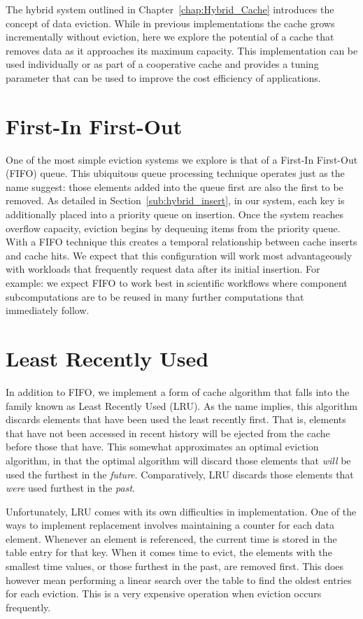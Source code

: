 The hybrid system outlined in Chapter~\ref{chap:Hybrid_Cache} introduces the
concept of data eviction. While in previous implementations the cache grows
incrementally without eviction, here we explore the potential of a cache that
removes data as it approaches its maximum capacity. This implementation can be
used individually or as part of a cooperative cache and provides a tuning
parameter that can be used to improve the cost efficiency of applications.

\section{First-In First-Out} %
\label{sec:fifo}
One of the most simple eviction systems we explore is that of a First-In
First-Out (FIFO) queue. This ubiquitous queue processing technique operates
just as the name suggest: those elements added into the queue first are also
the first to be removed. As detailed in Section~\ref{sub:hybrid_insert}, in our
system, each key is additionally placed into a priority queue on insertion. Once
the system reaches overflow capacity, eviction begins by dequeuing items from
the priority queue. With a FIFO technique this creates a temporal relationship
between cache inserts and cache hits. We expect that this configuration will
work most advantageously with workloads that frequently request data after its
initial insertion. For example: we expect FIFO to work best in scientific
workflows where component subcomputations are to be reused in many further
computations that immediately follow.


\section{Least Recently Used} %
\label{sec:lru}
In addition to FIFO, we implement a form of cache algorithm that falls into the
family known as Least Recently Used (LRU). As the name implies, this algorithm
discards elements that have been used the least recently first. That is,
elements that have not been accessed in recent history will be ejected from the
cache before those that have. This somewhat approximates an optimal eviction
algorithm, in that the optimal algorithm will discard those elements that
\emph{will} be used the furthest in the \emph{future}. Comparatively, LRU
discards those elements that \emph{were} used furthest in the \emph{past}.

Unfortunately, LRU comes with its own difficulties in implementation.
One of the ways to implement replacement involves maintaining a counter for
each data element. Whenever an element is referenced, the current time is
stored in the table entry for that key. When it comes time to evict, the
elements with the smallest time values, or those furthest in the past, are
removed first. This does however mean performing a linear search over the table
to find the oldest entries for each eviction. This is a very expensive
operation when eviction occurs frequently.


